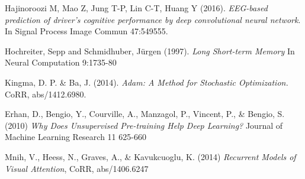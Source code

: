 \documentclass{article}
\begin{document}
\begin{thebibliography}{99}
	Hajinoroozi M, Mao Z, Jung T-P, Lin C-T, Huang Y (2016).
	\textit{EEG-based prediction of driver's cognitive performance by deep convolutional neural network}. 
	In Signal Process Image Commun 47:549555.
	
	Hochreiter, Sepp and Schmidhuber, Jürgen (1997).
	\textit{Long Short-term Memory}
	In Neural Computation 9:1735-80

	Kingma, D. P. \& Ba, J. (2014). 
	\textit{Adam: A Method for Stochastic Optimization.} 
	CoRR, abs/1412.6980. 

    Erhan, D., Bengio, Y., Courville, A., Manzagol, P., Vincent, P., \& Bengio, S. (2010)
    \textit{Why Does Unsupervised Pre-training Help Deep Learning?}
    Journal of Machine Learning Research 11 625-660

    Mnih, V., Heess, N., Graves, A., \& Kavukcuoglu, K. (2014)
    \textit{Recurrent Models of Visual Attention},
    CoRR, abs/1406.6247
	
\end{thebibliography}
\end{document}
